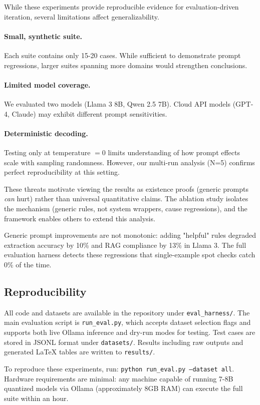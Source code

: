 While these experiments provide reproducible evidence for evaluation-driven iteration, several limitations affect generalizability.

\paragraph{Small, synthetic suite.} Each suite contains only 15-20 cases. While sufficient to demonstrate prompt regressions, larger suites spanning more domains would strengthen conclusions.

\paragraph{Limited model coverage.} We evaluated two models (Llama 3 8B, Qwen 2.5 7B). Cloud API models (GPT-4, Claude) may exhibit different prompt sensitivities.

\paragraph{Deterministic decoding.} Testing only at temperature $= 0$ limits understanding of how prompt effects scale with sampling randomness. However, our multi-run analysis (N=5) confirms perfect reproducibility at this setting.

These threats motivate viewing the results as existence proofs (generic prompts \emph{can} hurt) rather than universal quantitative claims. The ablation study isolates the mechanism (generic rules, not system wrappers, cause regressions), and the framework enables others to extend this analysis.

\begin{keytakeaways}
Generic prompt improvements are not monotonic: adding "helpful" rules degraded extraction accuracy by 10\% and RAG compliance by 13\% in Llama 3. The full evaluation harness detects these regressions that single-example spot checks catch 0\% of the time.
\end{keytakeaways}

\subsection{Reproducibility}

All code and datasets are available in the repository under \texttt{eval\_harness/}. The main evaluation script is \texttt{run\_eval.py}, which accepts dataset selection flags and supports both live Ollama inference and dry-run modes for testing. Test cases are stored in JSONL format under \texttt{datasets/}. Results including raw outputs and generated LaTeX tables are written to \texttt{results/}.

To reproduce these experiments, run: \texttt{python run\_eval.py --dataset all}. Hardware requirements are minimal: any machine capable of running 7-8B quantized models via Ollama (approximately 8GB RAM) can execute the full suite within an hour.
